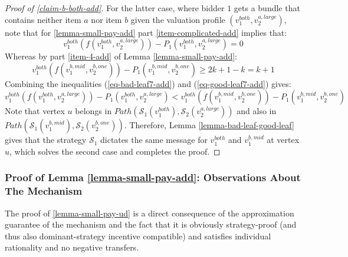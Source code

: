 \begin{proof}[Proof of \cref{claim-b-both-add}]
For the latter case, where bidder $1$ gets a bundle that contains neither item $a$ nor item $b$ given the valuation profile $(v_1^{both},v_2^{a,large})$, note that for \cref{lemma-small-pay-add} part \ref{item-complicated-add} implies that:
\begin{equation}\label{eq-bad-leaf7-add}
 v_1^{both}(f(v_1^{both},v_2^{a,large}))-P_1(v_1^{both},v_2^{a,large})=0   
\end{equation}
Whereas by part \ref{item-4-add} of Lemma \ref{lemma-small-pay-add}: 
 \begin{equation}\label{eq-good-leaf7-add}
 v_1^{both}(f(v_1^{b,mid},v_2^{b,one}))-P_1(v_1^{b,mid},v_2^{b,one}) \ge 2k+1-k=k+1 
\end{equation}
Combining the inequalities (\ref{eq-bad-leaf7-add}) and (\ref{eq-good-leaf7-add}) gives:
\begin{equation*}
 v_1^{both}(f(v_1^{both},v_2^{a,large}))-P_1(v_1^{both},v_2^{a,large})< 
 v_1^{both}(f(v_1^{b,mid},v_2^{b,one}))-P_1(v_1^{b,mid},v_2^{b,one})
\end{equation*}
Note that vertex $u$ belongs in $Path(\mathcal S_1(v_1^{both}),\mathcal S_2(v_2^{a,large}))$ and also in
$Path(\mathcal{S}_1(v_1^{b,mid}),\allowbreak\mathcal{S}_2(v_2^{b,one}))$. Therefore, Lemma \ref{lemma-bad-leaf-good-leaf} gives that the strategy $\mathcal S_1$ dictates the same message for  $v_1^{both}$ and $v_1^{b,mid}$ at vertex $u$, which solves the second case and completes the proof.
\end{proof}

\subsubsection{Proof of Lemma \ref{lemma-small-pay-add}: Observations About The Mechanism} \label{subsubsec-prop-alloc-add}
The proof of \cref{lemma-small-pay-ud} is a direct consequence of the approximation guarantee of the mechanism and the fact that it is 
obviously strategy-proof (and thus also dominant-strategy incentive compatible) and satisfies individual rationality and no negative transfers. 

